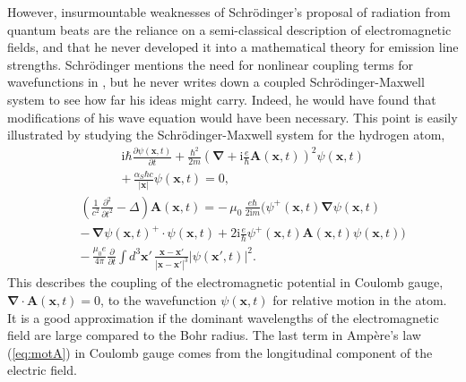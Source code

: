 \documentclass[final,3p,12pt]{elsarticle3}
\begin{document}
However, insurmountable weaknesses of Schr\"odinger's proposal of radiation from 
quantum beats are the reliance on a semi-classical description of electromagnetic
 fields, and that he never developed it into a mathematical theory for emission line 
strengths. Schr\"odinger mentions the need for nonlinear coupling terms for wavefunctions 
in \cite{erwin3}, but he never writes down a coupled Schr\"odinger-Maxwell system
to see how far his ideas might carry. Indeed, he would have found that modifications
of his wave equation would have been necessary. This point is easily illustrated
by studying the Schr\"odinger-Maxwell system for the hydrogen atom,
\begin{eqnarray}\nonumber
&&\!\!\!\mathrm{i}\hbar\frac{\partial\psi(\bm{x},t)}{\partial t}
+\frac{\hbar^2}{2m}\left(\bm{\nabla}+\mathrm{i}\frac{e}{\hbar}\bm{A}(\bm{x},t)\right)^2
\psi(\bm{x},t)
\\ \label{eq:motpsi}
&&+\,\frac{\alpha_S\hbar c}{|\bm{x}|}\psi(\bm{x},t)=0,
\end{eqnarray}
\begin{eqnarray}\nonumber
&&\!\!\!\left(\frac{1}{c^2}
\frac{\partial^2}{\partial t^2}-\Delta\right)
\bm{A}(\bm{x},t)=
-\,\mu_0\,\frac{e\hbar}{2\mathrm{i}m}
\Big(
\psi^+(\bm{x},t)\bm{\nabla}\psi(\bm{x},t)
\\ \nonumber
&&-\,\bm{\nabla}\psi(\bm{x},t)^+\cdot
\psi(\bm{x},t)
+2\mathrm{i}\frac{e}{\hbar}\psi^+(\bm{x},t)
\bm{A}(\bm{x},t)\psi(\bm{x},t)\Big)
\\ \label{eq:motA}
&&-\,\frac{\mu_0 e}{4\pi}\frac{\partial}{\partial t}\int\!d^3\bm{x}'\,
\frac{\bm{x}-\bm{x}'}{|\bm{x}-\bm{x}'|^3}|\psi(\bm{x}',t)|^2.
\end{eqnarray}
This describes the coupling of the electromagnetic potential in Coulomb gauge,
$\bm{\nabla}\cdot\bm{A}(\bm{x},t)=0$, to the wavefunction $\psi(\bm{x},t)$ for
relative motion in the atom. It is a good approximation if the dominant wavelengths 
of the electromagnetic field are large compared to the Bohr radius. The last term 
in Amp\`{e}re's law (\ref{eq:motA}) in Coulomb gauge comes from the longitudinal
component of the electric field.
\end{document}
